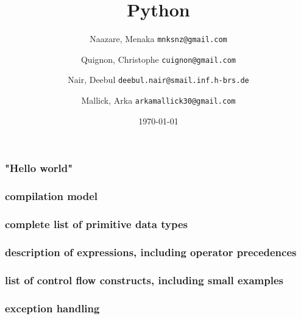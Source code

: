 \documentclass{beamer}
\begin{document}
\title{Python}
\subtitle{}
\author{
  Naazare, Menaka \texttt{mnksnz@gmail.com}  \\ \and
  Quignon, Christophe \texttt{cuignon@gmail.com}\\ \and
  Nair, Deebul \texttt{deebul.nair@smail.inf.h-brs.de} \\ \and
  Mallick, Arka \texttt{arkamallick30@gmail.com} \\ \and
} 
\date{\today}

\begin{frame}
\titlepage
\end{frame}





\begin{frame}
\frametitle{"Hello world"}
\framesubtitle{}
  
\end{frame}

\begin{frame}
\frametitle{compilation model}
\framesubtitle{}
  
\end{frame}

\begin{frame}
\frametitle{complete list of primitive data types}
\framesubtitle{}
  
\end{frame}

\begin{frame}
\frametitle{description of expressions, including operator precedences}
\framesubtitle{}
  
\end{frame}
\begin{frame}
\frametitle{list of control flow constructs, including small examples}
\framesubtitle{}
  
\end{frame}

\begin{frame}
\frametitle{exception handling}
\framesubtitle{}
  
\end{frame}


%         


\end{document}
